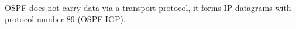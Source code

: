 OSPF does not carry data via a transport protocol, it forms IP datagrams with protocol number 89 (OSPF IGP).
